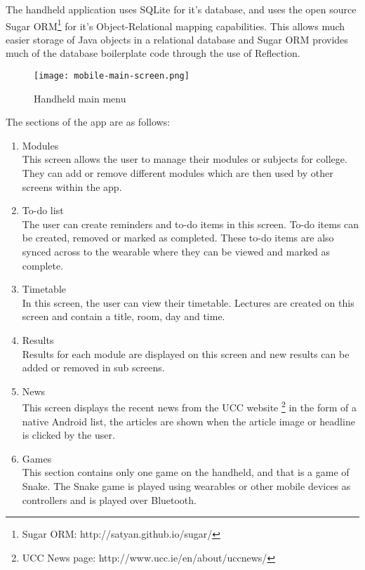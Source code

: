 The handheld application uses SQLite for it's database, and uses the open source
Sugar ORM\footnote{Sugar ORM: http://satyan.github.io/sugar/} for it's
Object-Relational mapping capabilities. This allows much easier storage of Java
objects in a relational database and Sugar ORM provides much of the database
boilerplate code through the use of Reflection.

\begin{figure}
    \centering
    \texttt{[image: mobile-main-screen.png]}
    \caption{Handheld main menu}
    \label{fig:handheld_main_menu}
\end{figure}

The sections of the app are as follows:
\begin{enumerate}
\item Modules\\
    This screen allows the user to manage their modules or subjects for
    college. They can add or remove different modules which are then used by
    other screens within the app.
\item To-do list\\
    The user can create reminders and to-do items in this screen. To-do items
    can be created, removed or marked as completed. These to-do items are also
    synced across to the wearable where they can be viewed and marked as
    complete.
\item Timetable\\
    In this screen, the user can view their timetable. Lectures are created on
    this screen and contain a title, room, day and time.
\item Results\\
    Results for each module are displayed on this screen and new results can be
    added or removed in sub screens.
\item News\\
    This screen displays the recent news from the UCC website
    \footnote{UCC News page: http://www.ucc.ie/en/about/uccnews/} in the form
    of a native Android list, the articles are shown when the article image or
    headline is clicked by the user.
\item Games\\
    This section contains only one game on the handheld, and that is a game of
    Snake. The Snake game is played using wearables or other mobile devices as
    controllers and is played over Bluetooth.
\end{enumerate}

